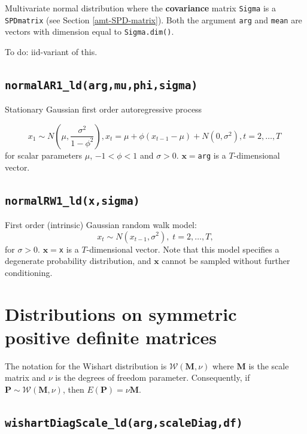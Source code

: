 \documentclass[
]{book}
\begin{document}
Multivariate normal distribution where the \textbf{covariance} matrix \texttt{Sigma} is a \texttt{SPDmatrix} (see Section \ref{amt-SPD-matrix}). Both the argument \texttt{arg} and \texttt{mean} are vectors with dimension equal to \texttt{Sigma.dim()}.

To do: iid-variant of this.

\hypertarget{normalar1_ldargmuphisigma}{%
\subsection{\texorpdfstring{\texttt{normalAR1\_ld(arg,mu,phi,sigma)}}{normalAR1\_ld(arg,mu,phi,sigma)}}\label{normalar1_ldargmuphisigma}}

Stationary Gaussian first order autoregressive process

\[
x_1 \sim N\left (\mu,\frac{\sigma^2}{1-\phi^2} \right), x_{t} = \mu + \phi ( x_{t-1}-\mu) + N(0,\sigma^2),t=2,\dots,T\;
\]
for scalar parameters \(\mu\), \(-1<\phi<1\) and \(\sigma>0\). \(\mathbf x=\)\texttt{arg} is a \(T\)-dimensional vector.

\hypertarget{normalrw1_ldxsigma}{%
\subsection{\texorpdfstring{\texttt{normalRW1\_ld(x,sigma)}}{normalRW1\_ld(x,sigma)}}\label{normalrw1_ldxsigma}}

First order (intrinsic) Gaussian random walk model:
\[
x_t \sim N(x_{t-1},\sigma^2),\; t=2,\dots,T,
\]
for \(\sigma>0\). \(\mathbf x=\)\texttt{x} is a \(T\)-dimensional vector. Note that this model specifies a degenerate probability distribution, and \(\mathbf x\) cannot be sampled without further conditioning.

\hypertarget{distributions-on-symmetric-positive-definite-matrices}{%
\section{Distributions on symmetric positive definite matrices}\label{distributions-on-symmetric-positive-definite-matrices}}

The notation for the Wishart distribution is \(\mathcal W(\mathbf M,\nu)\) where \(\mathbf M\) is the scale matrix and \(\nu\) is the degrees of freedom parameter. Consequently, if \(\mathbf P \sim \mathcal W(\mathbf M,\nu)\), then \(E(\mathbf P)=\nu \mathbf M\).

\hypertarget{wishartdiagscale_ldargscalediagdf}{%
\subsection{\texorpdfstring{\texttt{wishartDiagScale\_ld(arg,scaleDiag,df)}}{wishartDiagScale\_ld(arg,scaleDiag,df)}}\label{wishartdiagscale_ldargscalediagdf}}
\end{document}
